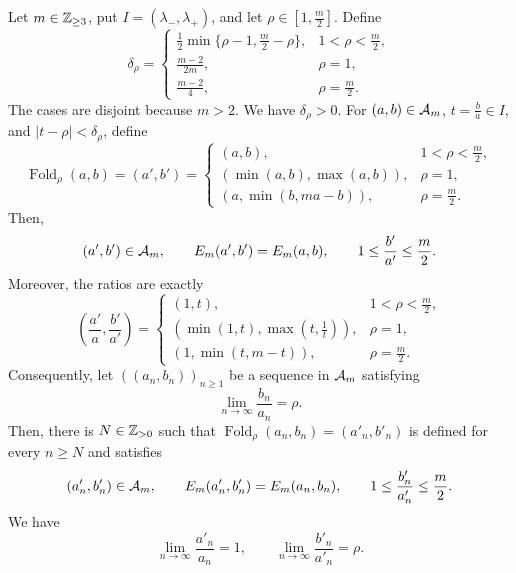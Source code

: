 \begin{lemma}\label{lem:reduction-endpoint-fold}
Let $m\in\mathbb Z_{\ge3}$, put $I=(\lambda_-,\lambda_+)$, and let $\rho\in[1,\frac m2]$. Define
\[
 \delta_\rho=
 \begin{cases}
 \frac12\min\{\rho-1,\frac m2-\rho\},&1<\rho<\frac m2,\\
 \frac{m-2}{2m},&\rho=1,\\
 \frac{m-2}{4},&\rho=\frac m2.
 \end{cases}
\]
The cases are disjoint because $m>2$. We have $\delta_\rho>0$. For $(a,b)\in\mathcal A_m$, $t=\frac ba\in I$, and $|t-\rho|<\delta_\rho$, define
\[
 \operatorname{Fold}_\rho(a,b)=(a',b')=
 \begin{cases}
 (a,b),&1<\rho<\frac m2,\\
 (\min(a,b),\max(a,b)),&\rho=1,\\
 (a,\min(b,ma-b)),&\rho=\frac m2.
 \end{cases}
\]
Then,
\[
 (a',b')\in\mathcal A_m,\qquad E_m(a',b')=E_m(a,b),\qquad
 1\le \frac{b'}{a'}\le \frac m2.
\]
Moreover, the ratios are exactly
\[
 \left(\frac{a'}a,\frac{b'}{a'}\right)=
 \begin{cases}
 (1,t),&1<\rho<\frac m2,\\
 (\min(1,t),\max(t,\frac1t)),&\rho=1,\\
 (1,\min(t,m-t)),&\rho=\frac m2.
 \end{cases}
\]
Consequently, let $((a_n,b_n))_{n\ge1}$ be a sequence in $\mathcal A_m$ satisfying
\[
 \lim_{n\to\infty}\frac{b_n}{a_n}=\rho.
\]
Then, there is $N\in\mathbb Z_{>0}$ such that $\operatorname{Fold}_\rho(a_n,b_n)=(a'_n,b'_n)$ is defined for every $n\ge N$ and satisfies
\[
 (a'_n,b'_n)\in\mathcal A_m,\qquad E_m(a'_n,b'_n)=E_m(a_n,b_n),\qquad 1\le\frac{b'_n}{a'_n}\le\frac m2.
\]
We have
\[
 \lim_{n\to\infty}\frac{a'_n}{a_n}=1,\qquad
 \lim_{n\to\infty}\frac{b'_n}{a'_n}=\rho.
\]
\end{lemma}
